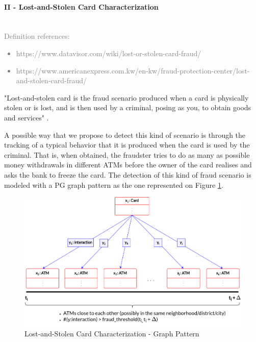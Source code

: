 \paragraph{II - Lost-and-Stolen Card Characterization\\\\}

\textcolor{gray}{Definition references:
\begin{itemize}
    \item https://www.datavisor.com/wiki/lost-or-stolen-card-fraud/
    \item https://www.americanexpress.com.kw/en-kw/fraud-protection-center/lost-and-stolen-card-fraud/
\end{itemize}
}

"Lost-and-stolen card is the fraud scenario produced when a card is physically stolen or is lost, and is then used by a criminal, posing as you, to obtain goods and services" \cite{FP-lost-and-stolen-americanexpress2025}.

A possible way that we propose to detect this kind of scenario is through the tracking of a typical behavior that it is produced when the card is used by the criminal. That is, when obtained, the fraudster tries to do as many as possible money withdrawals in different ATMs before the owner of the card realises and asks the bank to freeze the card. The detection of this kind of fraud scenario is modeled with a PG graph pattern as the one represented on Figure \ref{img:graphPattern-2}.

\begin{figure}[H]
  \centering
  \includegraphics[scale = 0.7]{images/2-QueryModel/graphPattern-2.png}
  \caption{Lost-and-Stolen Card Characterization - Graph Pattern}
  \label{img:graphPattern-2}
\end{figure}


